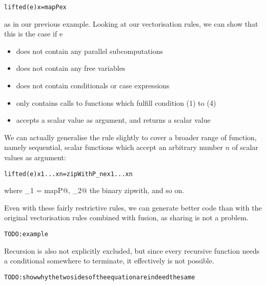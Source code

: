   \begin{alltt}
   lifted (e) x = mapP e x
\end{alltt}
   as in our previous example. Looking at our vectorisation rules, we can show that this is the case
   if e
   \begin{itemize}
    \item does not contain any parallel subcomputations
    \item does not contain any free variables
    \item does not contain conditionals or case expressions
    \item only contains calls to functions which fulfill condition (1) to (4)
    \item accepts a scalar value as argument, and returns a scalar value
\end{itemize}
    We can actually generalise the rule slightly to cover a broader range of function, namely sequential, scalar functions which accept an arbitrary number $n$ of scalar values as argument:
  \begin{alltt}
   lifted (e) x1 ... xn = zipWithP_n e x1 ... xn
\end{alltt}
    where \icode@zipWithP_1 = mapP@, \icode@zipWithP_2@ the binary zipwith, and so on. 

 

    Even with these fairly restrictive rules, we can generate better code than with the original 
    vectorisation rules combined with fusion, as sharing is not a problem. 
\begin{alltt}
TODO: example
\end{alltt}


    Recursion is also not
    explicitly excluded, but since every recursive function needs a conditional somewhere to terminate, it effectively is not possible.

    \begin{alltt}
TODO: show why the two sides of the equation are indeed the same
\end{alltt}

